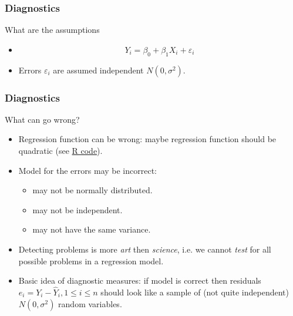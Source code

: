 \documentclass[handout]{beamer}
\begin{document}

   \begin{frame} \frametitle{Diagnostics}

   \begin{block}
   {What are the assumptions}
   \begin{itemize}
   \item $$
   Y_i = \beta_0 + \beta_1 X_{i} + \varepsilon_i
   $$
   \item Errors $\varepsilon_i$ are assumed independent $N(0,\sigma^2)$.
   \end{itemize}

   \end{block}
   \end{frame}


   \begin{frame} \frametitle{Diagnostics}

   \begin{block}
   {What can go wrong?}

   \begin{itemize}

   \item
   Regression function can be wrong: maybe regression function should be quadratic
   (see \href{http://stats191.stanford.edu/simple_diagnostics.html#poorly-fitting-linear-model}{R code}).

   \item Model for the errors
   may be incorrect:
   \begin{itemize}
   \item  may not be normally distributed.
   \item  may not be independent.

   \item  may not have the same variance.
   \end{itemize}

   \item Detecting problems is more {\em art} then {\em science}, i.e.
   we cannot {\em test} for all possible problems in a regression model.

   \item Basic idea of diagnostic measures: if model is correct then
   residuals $e_i = Y_i -\widehat{Y}_i, 1 \leq i \leq n$ should look like a sample of
   (not quite independent) $N(0, \sigma^2)$ random variables.
   \end{itemize}
   \end{block}
   \end{frame}
\end{document}
